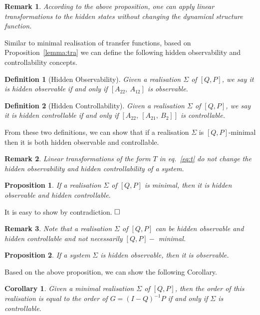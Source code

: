 \documentclass[twocolumn,12pt]{autart}
\theoremstyle{plain}
\newtheorem{proposition}{Proposition}
\newtheorem{corollary}{Corollary}
\newtheorem{definition}{Definition}
\newtheorem{remark}{Remark}
\newenvironment{proof}[1][Proof]{\begin{trivlist} \item[\hskip \labelsep {\bfseries #1}]}{\end{trivlist}}
\begin{document}
\begin{remark}
According to the above proposition, one can apply linear transformations to the hidden states without changing the dynamical structure function. \end{remark}
Similar to minimal realisation of transfer functions, based on Proposition~\ref{lemma:tra} we can define the following hidden observability and controllability concepts. 

\begin{definition}[Hidden Observability]
Given a realisation  $\Sigma$ of $[Q,P]$, we say it is hidden observable if and only if $[A_{22},~A_{12}]$ is observable.
\end{definition}

\begin{definition}[Hidden Controllability]
Given a realisation $\Sigma$ of $[Q,P]$, we say it is hidden controllable if and only if $\left[A_{22},~[A_{21},~B_2]\right]$ is controllable.  
\end{definition}

From these two definitions, we can show that if a realisation $\Sigma$ is $[Q,P]$-minimal then it is both hidden observable and controllable.

\begin{remark}
Linear transformations of the form $T$ in eq.~\eqref{eq:t} do not change the hidden observability and hidden controllability of a system.
\end{remark}

\begin{proposition}\label{th:hidden}
If a realisation $\Sigma$ of $[Q,P]$ is minimal, then it is hidden observable and hidden controllable.
\end{proposition}
\begin{proof}
It is easy to show by contradiction. $\hfill \square$
\end{proof}

\begin{remark}
Note that a realisation $\Sigma$ of $[Q,P]$ can be hidden observable and hidden controllable and not necessarily $[Q,P]-$ minimal. 
\end{remark}

\begin{proposition}\label{th:obserable} 
If a system $\Sigma$ is hidden observable, then it is observable.
\end{proposition}

Based on the above proposition, we can show the following Corollary.
\begin{corollary}
Given a minimal realisation $\Sigma$ of $[Q,P]$, then the order of this realisation is equal to the order of $G=(I-Q)^{-1}P$ if and only if $\Sigma$ is controllable.
\end{corollary}
\end{document}
